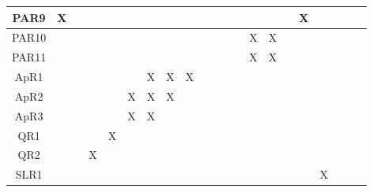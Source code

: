 \documentclass[12pt]{article}
\begin{document}
\begin{landscape}
\begin{table}[h!]
{\begin{tabular}{|c|c|c|c|c|c|c|c|c|c|c|c|c|c|c|c|c|c|c|c|c|}
            PAR9 &  X&   &   &   &   &   &   &   &   &    &    &    &    &    &    &   X & & & &\\ \hline
            PAR10&   &   &   &   &   &   &   &   &   &    &    &    &   X&   X&    &     & & & &\\ \hline
            PAR11&   &   &   &   &   &   &   &   &   &    &    &    &   X&   X&    &     & & & &\\ \hline
            ApR1 &   &   &   &   &   &  X&  X&  X&   &    &    &    &    &    &    &     & & & &\\ \hline
            ApR2 &   &   &   &   &  X&  X&  X&   &   &    &    &    &    &    &    &     & & & &\\ \hline
            ApR3 &   &   &   &   &  X&  X&   &   &   &    &    &    &    &    &    &     & & & &\\ \hline
            QR1  &   &   &   &  X&   &   &   &   &   &    &    &    &    &    &    &     & & & &\\ \hline
            QR2  &   &   &  X&   &   &   &   &   &   &    &    &    &    &    &    &     & & & &\\ \hline
            SLR1  &   &   &   &   &   &   &   &   &   &    &    &    &    &    &    &    & X&  &  & \\ \hline

\end{tabular}}
\end{table}
\end{landscape}
\end{document}
